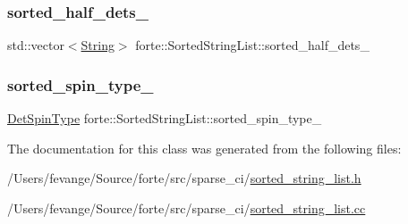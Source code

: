 \mbox{\label{classforte_1_1_sorted_string_list_ae1f10c54a9d0c1489c69cb6bbe8fe523}} 
\subsubsection{\texorpdfstring{sorted\+\_\+half\+\_\+dets\+\_\+}{sorted\_half\_dets\_}}
{\footnotesize\ttfamily std\+::vector$<$\mbox{\hyperlink{namespaceforte_a840d1bfd3a8b3c16e09979212f37313f}{String}}$>$ forte\+::\+Sorted\+String\+List\+::sorted\+\_\+half\+\_\+dets\+\_\+\hspace{0.3cm}{\ttfamily [protected]}}

\mbox{\label{classforte_1_1_sorted_string_list_ab11048510565a3459df8a6f570cd2730}} 
\subsubsection{\texorpdfstring{sorted\+\_\+spin\+\_\+type\+\_\+}{sorted\_spin\_type\_}}
{\footnotesize\ttfamily \mbox{\hyperlink{namespaceforte_acb88fa63430aae4a1b15c7be9c55f179}{Det\+Spin\+Type}} forte\+::\+Sorted\+String\+List\+::sorted\+\_\+spin\+\_\+type\+\_\+\hspace{0.3cm}{\ttfamily [protected]}}



The documentation for this class was generated from the following files\+:\begin{DoxyCompactItemize}
\item 
/\+Users/fevange/\+Source/forte/src/sparse\+\_\+ci/\mbox{\hyperlink{sorted__string__list_8h}{sorted\+\_\+string\+\_\+list.\+h}}\item 
/\+Users/fevange/\+Source/forte/src/sparse\+\_\+ci/\mbox{\hyperlink{sorted__string__list_8cc}{sorted\+\_\+string\+\_\+list.\+cc}}\end{DoxyCompactItemize}

